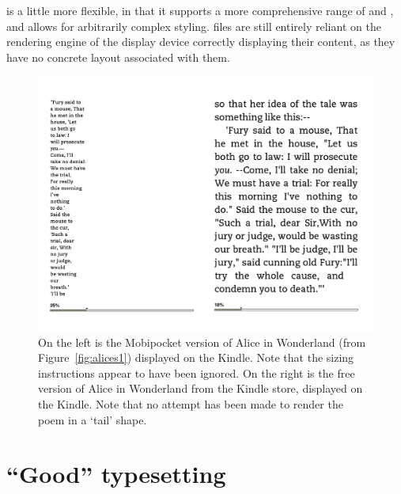 \epub{} is a little more flexible, in that it supports a more comprehensive range of \xhtml{} and \css{}, and allows for arbitrarily complex styling. \epub{} files are still entirely reliant on the rendering engine of the display device correctly displaying their content, as they have no concrete layout associated with them.

\begin{figure}[tb]
\begin{center}
\vspace{-.3in}
\includegraphics[width=\textwidth]{gfx/alices2}
\end{center}
\vspace{-.3in}
\caption[The same document displayed on the Kindle]{On the left is the Mobipocket version of Alice in Wonderland (from Figure~\ref{fig:alices1}) displayed on the Kindle. Note that the sizing instructions appear to have been ignored. On the right is the free version of Alice in Wonderland from the Kindle store, displayed on the Kindle. Note that no attempt has been made to render the poem in a `tail' shape.}
\label{fig:alices2}
\end{figure}

\section{``Good'' typesetting}
\label{sec:goodtypesetting}

